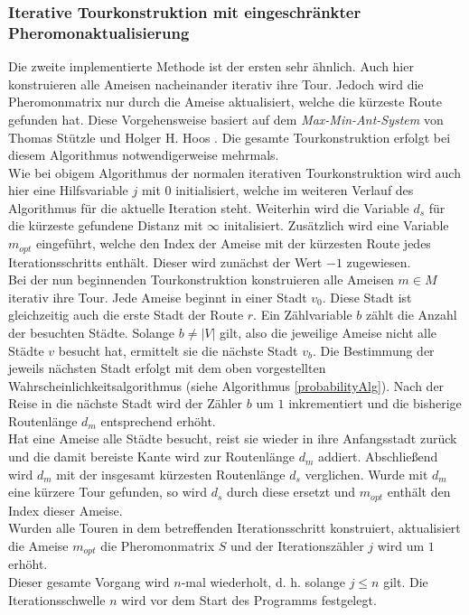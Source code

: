 \documentclass[doktyp=barbeit, sprache=german]{TUBAFarbeiten}
\begin{document}
\subsubsection{Iterative Tourkonstruktion mit eingeschränkter Pheromonaktualisierung}
Die zweite implementierte Methode ist der ersten sehr ähnlich. Auch hier konstruieren alle Ameisen nacheinander iterativ ihre Tour. Jedoch wird die Pheromonmatrix nur durch die Ameise aktualisiert, welche die kürzeste Route gefunden hat. Diese Vorgehensweise basiert auf dem \textit{Max-Min-Ant-System} von Thomas Stützle und Holger H. Hoos \cite{MaxMin}. Die gesamte Tourkonstruktion erfolgt bei diesem Algorithmus notwendigerweise mehrmals. 
\\Wie bei obigem Algorithmus der normalen iterativen Tourkonstruktion wird auch hier eine Hilfsvariable $j$ mit $0$ initialisiert, welche im weiteren Verlauf des Algorithmus für die aktuelle Iteration steht. Weiterhin wird die Variable $d_s$ für die kürzeste gefundene Distanz mit $\infty$ initalisiert. Zusätzlich wird eine Variable $m_{opt}$ eingeführt, welche den Index der Ameise mit der kürzesten Route jedes Iterationsschritts enthält. Dieser wird zunächst der Wert $-1$ zugewiesen.
\\Bei der nun beginnenden Tourkonstruktion konstruieren alle Ameisen $m \in M$ iterativ ihre Tour. Jede Ameise beginnt in einer Stadt $v_0$. Diese Stadt ist gleichzeitig auch die erste Stadt der Route $r$. Ein Zählvariable $b$ zählt die Anzahl der besuchten Städte. Solange $b \neq |V|$ gilt, also die jeweilige Ameise nicht alle Städte $v$ besucht hat, ermittelt sie die nächste Stadt $v_b$. Die Bestimmung der jeweils nächsten Stadt erfolgt mit dem oben vorgestellten Wahrscheinlichkeitsalgorithmus (siehe Algorithmus \ref{probabilityAlg}). Nach der Reise in die nächste Stadt wird der Zähler $b$ um $1$ inkrementiert und die bisherige Routenlänge $d_m$ entsprechend erhöht.
\\Hat eine Ameise alle Städte besucht, reist sie wieder in ihre Anfangsstadt zurück und die damit bereiste Kante wird zur Routenlänge $d_m$ addiert. Abschließend wird $d_m$ mit der insgesamt kürzesten Routenlänge $d_s$ verglichen. Wurde mit $d_m$ eine kürzere Tour gefunden, so wird $d_s$ durch diese ersetzt und $m_{opt}$ enthält den Index dieser Ameise. 
\\Wurden alle Touren in dem betreffenden Iterationsschritt konstruiert, aktualisiert die Ameise $m_{opt}$ die Pheromonmatrix $S$ und der Iterationszähler $j$ wird um $1$ erhöht. 
\\Dieser gesamte Vorgang wird $n$-mal wiederholt, d. h. solange $j \leq n$ gilt. Die Iterationsschwelle $n$ wird vor dem Start des Programms festgelegt. 
\end{document}
